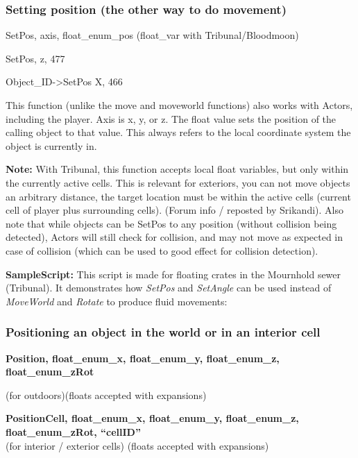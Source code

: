 \documentclass[
]{article}
\begin{document}
\hypertarget{setting-position-the-other-way-to-do-movement}{%
\subsubsection{Setting position (the other way to do
movement)}\label{setting-position-the-other-way-to-do-movement}}

SetPos, axis, float\_enum\_pos (float\_var with Tribunal/Bloodmoon)

SetPos, z, 477

Object\_ID-\textgreater SetPos X, 466

This function (unlike the move and moveworld functions) also works with
Actors, including the player. Axis is x, y, or z. The float value sets
the position of the calling object to that value. This always refers to
the local coordinate system the object is currently in.

\textbf{Note:} With Tribunal, this function accepts local float
variables, but only within the currently active cells. This is relevant
for exteriors, you can not move objects an arbitrary distance, the
target location must be within the active cells (current cell of player
plus surrounding cells). (Forum info / reposted by Srikandi). Also note
that while objects can be SetPos to any position (without collision
being detected), Actors will still check for collision, and may not move
as expected in case of collision (which can be used to good effect for
collision detection).

\textbf{SampleScript:} This script is made for floating crates in the
Mournhold sewer (Tribunal). It demonstrates how \emph{SetPos} and
\emph{SetAngle} can be used instead of \emph{MoveWorld} and
\emph{Rotate} to produce fluid movements:



\hypertarget{positioning-an-object-in-the-world-or-in-an-interior-cell}{%
\subsubsection{Positioning an object in the world or in an interior
cell}\label{positioning-an-object-in-the-world-or-in-an-interior-cell}}

\textbf{Position, float\_enum\_x, float\_enum\_y, float\_enum\_z,
float\_enum\_zRot}

(for outdoors)(floats accepted with expansions)

\textbf{PositionCell, float\_enum\_x, float\_enum\_y, float\_enum\_z,
float\_enum\_zRot, ``cellID''\\
}(for interior / exterior cells) (floats accepted with expansions)
\end{document}
